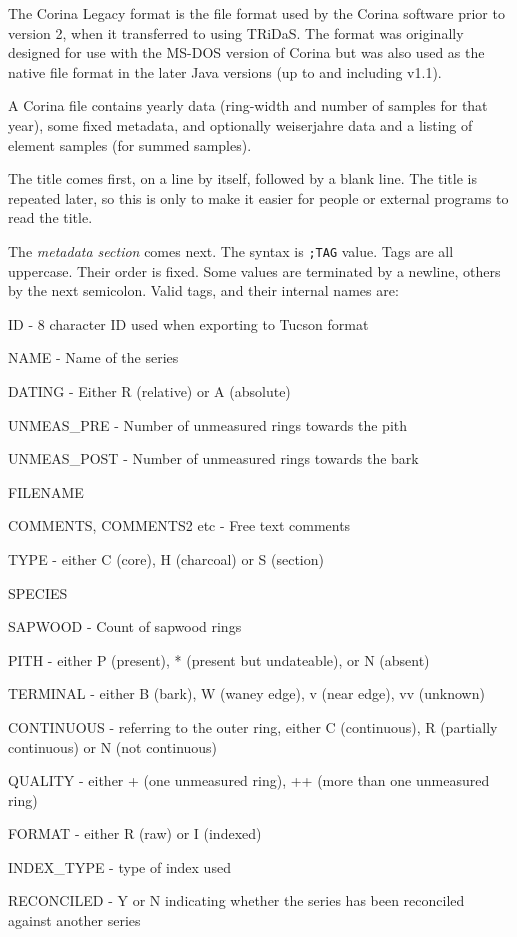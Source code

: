 The Corina Legacy format is the file format used by the Corina software prior to version 2, when it transferred to using TRiDaS. The format was originally designed for use with the MS-DOS version of Corina but was also used as the native file format in the later Java versions (up to and including v1.1).

A Corina file contains yearly data (ring-width and number of samples for that year), some fixed metadata, and optionally weiserjahre data and a listing of element samples (for summed samples).

The title comes first, on a line by itself, followed by a blank line. The title is repeated later, so this is only to make it easier for people or external programs to read the title.

The \emph{metadata section} comes next. The syntax is \verb|;TAG| value. Tags are all uppercase. Their order is fixed. Some values are terminated by a newline, others by the next semicolon. Valid tags, and their internal names are: 

\begin{itemize*}
 \item ID - 8 character ID used when exporting to Tucson format
\item  NAME - Name of the series
\item  DATING - Either R (relative) or A (absolute)
\item  UNMEAS\_PRE - Number of unmeasured rings towards the pith
\item  UNMEAS\_POST - Number of unmeasured rings towards the bark
\item  FILENAME
\item  COMMENTS, COMMENTS2 etc - Free text comments
\item  TYPE - either C (core), H (charcoal) or S (section)
\item  SPECIES
\item  SAPWOOD - Count of sapwood rings
\item  PITH - either P (present), * (present but undateable), or N (absent)
\item  TERMINAL - either B (bark), W (waney edge), v (near edge), vv (unknown)
\item  CONTINUOUS - referring to the outer ring, either C (continuous), R (partially continuous) or N (not continuous)
\item  QUALITY - either + (one unmeasured ring), ++ (more than one unmeasured ring)
\item  FORMAT - either R (raw) or I (indexed)
\item  INDEX\_TYPE - type of index used
\item  RECONCILED - Y or N indicating whether the series has been reconciled against another series 
\end{itemize*}

